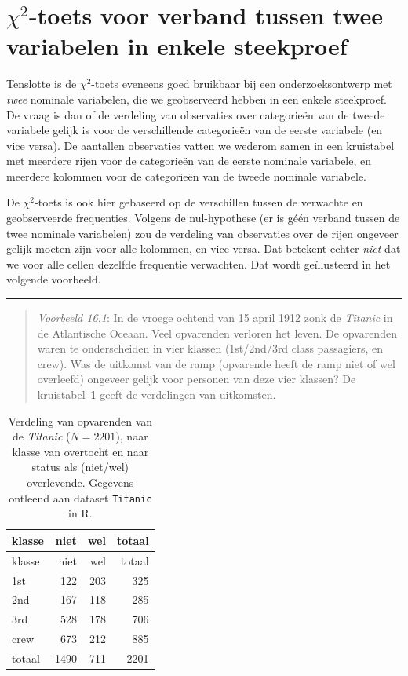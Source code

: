 \documentclass[
]{book}
\begin{document}
\hypertarget{chi2-toets-voor-verband-tussen-twee-variabelen-in-enkele-steekproef}{%
\section{\texorpdfstring{\(\chi^2\)-toets voor verband tussen twee variabelen in enkele steekproef}{\textbackslash chi\^{}2-toets voor verband tussen twee variabelen in enkele steekproef}}\label{chi2-toets-voor-verband-tussen-twee-variabelen-in-enkele-steekproef}}

Tenslotte is de \(\chi^2\)-toets eveneens goed bruikbaar bij een onderzoeksontwerp met
\emph{twee} nominale variabelen, die we geobserveerd hebben in een enkele
steekproef. De vraag is dan of de verdeling van observaties over
categorieën van de tweede variabele gelijk is voor de verschillende
categorieën van de eerste variabele (en vice versa). De aantallen
observaties vatten we wederom samen in een kruistabel met meerdere rijen
voor de categorieën van de eerste nominale variabele, en meerdere
kolommen voor de categorieën van de tweede nominale variabele.

De \(\chi^2\)-toets is ook hier gebaseerd op de verschillen tussen de verwachte en
geobserveerde frequenties. Volgens de nul-hypothese (er is géén verband
tussen de twee nominale variabelen) zou de verdeling van observaties
over de rijen ongeveer gelijk moeten zijn voor alle kolommen, en vice
versa. Dat betekent echter \emph{niet} dat we voor alle cellen dezelfde
frequentie verwachten. Dat wordt geïllusteerd in het volgende voorbeeld.

\begin{center}\rule{0.5\linewidth}{0.5pt}\end{center}

\begin{quote}
\emph{Voorbeeld 16.1}: In de vroege ochtend
van 15 april 1912 zonk de \emph{Titanic} in de Atlantische Oceaan. Veel
opvarenden verloren het leven. De opvarenden waren te onderscheiden in
vier klassen (1st/2nd/3rd class passagiers, en crew). Was de uitkomst
van de ramp (opvarende heeft de ramp niet of wel overleefd) ongeveer gelijk voor personen van
deze vier klassen? De kruistabel~\ref{tab:titanic} geeft de verdelingen van uitkomsten.
\end{quote}

\begin{longtable}[]{@{}lrrr@{}}
\caption{\label{tab:titanic} Verdeling van opvarenden van de \emph{Titanic} (\(N=2201\)), naar klasse van overtocht en naar status als (niet/wel) overlevende. Gegevens ontleend aan dataset \texttt{Titanic} in R.}\tabularnewline
\toprule
klasse & niet & wel & totaal\tabularnewline
\midrule
\endfirsthead
\toprule
klasse & niet & wel & totaal\tabularnewline
\midrule
\endhead
1st & 122 & 203 & 325\tabularnewline
2nd & 167 & 118 & 285\tabularnewline
3rd & 528 & 178 & 706\tabularnewline
crew & 673 & 212 & 885\tabularnewline
totaal & 1490 & 711 & 2201\tabularnewline
\bottomrule
\end{longtable}
\end{document}
